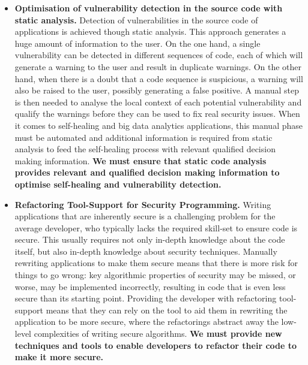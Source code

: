 \documentclass[a4paper,11pt]{article}
\begin{document}
\begin{itemize}
\item {\textbf{Optimisation of vulnerability detection in the source code with static analysis.}} Detection of vulnerabilities in the source code of applications is achieved though static analysis. This approach generates a huge amount of information to the user. On the one hand, a single vulnerability can be detected in different sequences of code, each of which will generate a warning to the user and result in duplicate warnings. On the other hand, when there is a doubt that a code sequence is suspicious, a warning will also be raised to the user, possibly generating a false positive. A manual step is then needed to analyse the local context of each potential vulnerability and qualify the warnings before they can be used to fix real security issues. When it comes to 
self-healing and big data analytics applications, this manual phase must be automated and additional information is required from static analysis to feed the self-healing process with relevant qualified decision making information.
\textbf{We must ensure that static code analysis provides relevant and qualified decision making information to optimise self-healing and vulnerability detection.} 

\item \textbf{Refactoring Tool-Support for Security Programming.}
Writing applications that are inherently secure is a challenging problem for the average developer, who typically lacks the required skill-set to ensure code is secure. This usually requires not only in-depth knowledge about the code itself, but also in-depth knowledge about security techniques. Manually rewriting applications to make them secure means that there is more risk for things to go wrong: key algorithmic properties of security may be missed, or worse, may be implemented incorrectly, resulting in code that is even less secure than its starting point. Providing the developer with refactoring tool-support means that they can rely on the tool to aid them in rewriting the application to be more secure, where the refactorings abstract away the low-level complexities of writing secure algorithms. 
\textbf{We must provide new techniques and tools to enable developers to refactor their code to make it more secure.}


\end{itemize}
\end{document}
